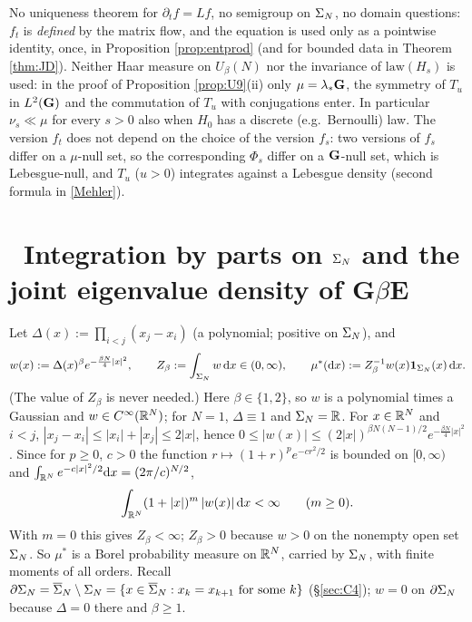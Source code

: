 \begin{remark}
No uniqueness theorem for $\partial_tf=Lf$, no semigroup on $\Sigma_N$, no domain questions: $f_t$ is \emph{defined} by the matrix flow, and the equation is used only as a pointwise identity, once, in Proposition \ref{prop:entprod} (and for bounded data in Theorem \ref{thm:JD}).
Neither Haar measure on $U_\beta(N)$ nor the invariance of $\mathrm{law}(H_s)$ is used: in the proof of Proposition \ref{prop:U9}(ii) only $\mu=\lambda_*\mathbf{G}$, the symmetry of $T_u$ in $L^2(\mathbf{G})$ and the commutation of $T_u$ with conjugations enter. In particular $\nu_s\ll\mu$ for every $s>0$ also when $H_0$ has a discrete (e.g.\ Bernoulli) law.
The version $f_t$ does not depend on the choice of the version $f_s$: two versions of $f_s$ differ on a $\mu$-null set, so the corresponding $\Phi_s$ differ on a $\mathbf{G}$-null set, which is Lebesgue-null, and $T_u$ ($u>0$) integrates against a Lebesgue density (second formula in \eqref{Mehler}).
\end{remark}
\section{\INFRA\ Integration by parts on $\Sigma_N$ and the joint eigenvalue density of G$\beta$E}\label{sec:C5}

Let $\Delta(x):=\prod_{i<j}(x_j-x_i)$ (a polynomial; positive on $\Sigma_N$), and
\begin{equation}\label{mustar}
w(x):=\Delta(x)^\beta e^{-\frac{\beta N}{4}|x|^2},\qquad Z_\beta:=\int_{\Sigma_N}w\,\mathrm{d} x\in(0,\infty),\qquad \mu^*(\mathrm{d} x):=Z_\beta^{-1}w(x)\mathbf 1_{\Sigma_N}(x)\,\mathrm{d} x .
\end{equation}
(The value of $Z_\beta$ is never needed.) Here $\beta\in\{1,2\}$, so $w$ is a polynomial times a Gaussian and $w\in C^\infty(\mathbb{R}^N)$; for $N=1$, $\Delta\equiv1$ and $\Sigma_N=\mathbb{R}$.
For $x\in\mathbb{R}^N$ and $i<j$, $|x_j-x_i|\le|x_i|+|x_j|\le2|x|$, hence $0\le|w(x)|\le(2|x|)^{\beta N(N-1)/2}e^{-\frac{\beta N}4|x|^2}$. Since for $p\ge0$, $c>0$ the function $r\mapsto(1+r)^pe^{-cr^2/2}$ is bounded on $[0,\infty)$ and $\int_{\mathbb{R}^N}e^{-c|x|^2/2}\mathrm{d} x=(2\pi/c)^{N/2}$,
\begin{equation}\label{c5:mom}
\int_{\mathbb{R}^N}(1+|x|)^m\,|w(x)|\,\mathrm{d} x<\infty\qquad(m\ge0).
\end{equation}
With $m=0$ this gives $Z_\beta<\infty$; $Z_\beta>0$ because $w>0$ on the nonempty open set $\Sigma_N$. So $\mu^*$ is a Borel probability measure on $\mathbb{R}^N$, carried by $\Sigma_N$, with finite moments of all orders.
Recall $\partial\Sigma_N=\overline{\Sigma}_N\setminus\Sigma_N=\{x\in\overline{\Sigma}_N:x_k=x_{k+1}\text{ for some }k\}$ (\S\ref{sec:C4}); $w=0$ on $\partial\Sigma_N$ because $\Delta=0$ there and $\beta\ge1$.

